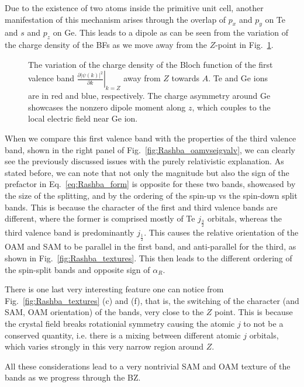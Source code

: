 Due to the existence of two atoms inside the primitive unit cell, another manifestation of this mechanism arises through the overlap of $p_x$ and $p_y$ on Te and $s$ and $p_z$ on Ge.
This leads to a dipole as can be seen from the variation of the charge density of the BFs as we move away from the $Z$-point in Fig.~\ref{fig:Rashba_diffdens}.
\begin{figure}[h]
\caption{\label{fig:Rashba_diffdens}The variation of the charge density of the Bloch function of the first valence band $\left.\frac{\partial |\psi(k)|^2}{\partial k}\right\rvert_{k=Z}$ away from $Z$ towards $A$. Te and Ge ions are in red and blue, respectively. The charge asymmetry around Ge showcases the nonzero dipole moment along $z$, which couples to the local electric field near Ge ion.}
\end{figure}

When we compare this first valence band with the properties of the third valence band, shown in the right panel of Fig.~\ref{fig:Rashba_oamvseigvalv}, we can clearly see the previously discussed issues with the purely relativistic explanation.
As stated before, we can note that not only the magnitude but also the sign of the prefactor in Eq.~\ref{eq:Rashba_form} is opposite for these two bands, showcased by the size of the splitting, and by the ordering of the spin-up vs the spin-down split bands.
This is because the character of the first and third valence bands are different, where the former is comprised mostly of Te $j_{\frac{3}{2}}$ orbitals, whereas the third valence band is predominantly $j_{\frac{1}{2}}$.
This causes the relative orientation of the OAM and SAM to be parallel in the first band, and anti-parallel for the third, as shown in Fig.~\ref{fig:Rashba_textures}.
This then leads to the different ordering of the spin-split bands and opposite sign of $\alpha_R$.

There is one last very interesting feature one can notice from Fig.~\ref{fig:Rashba_textures} (c) and (f), that is, the switching of the character (and SAM, OAM orientation) of the bands, very close to the $Z$ point.
This is because the crystal field breaks rotationial symmetry causing the atomic $j$ to not be a conserved quantity, i.e. there is a mixing between different atomic $j$ orbitals, which varies strongly in this very narrow region around $Z$.

All these considerations lead to a very nontrivial SAM and OAM texture of the bands as we progress through the BZ.


